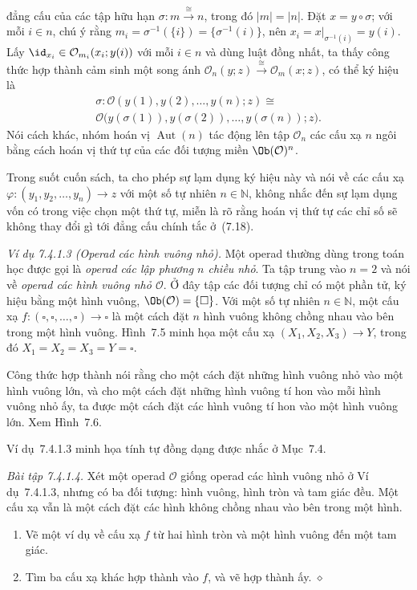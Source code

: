 đẳng cấu của các tập hữu hạn $\sigma:m\xrightarrow{\cong}n$, trong đó $|m|=|n|$. Đặt $x=y\circ\sigma$; với mỗi $i\in n$, chú ý rằng $m_i=\sigma^{-1}(\{i\})=\{\sigma^{-1}(i)\}$, nên $x_i=x|_{\sigma^{-1}(i)}=y(i)$. Lấy $\id_{x_i}\in\mathcal O_{m_i}(x_i;y(i))$ với mỗi $i\in n$ và dùng luật đồng nhất, ta thấy công thức hợp thành cảm sinh một song ánh $\mathcal O_n(y;z)\xrightarrow{\cong}\mathcal O_m(x;z)$, có thể ký hiệu là
\begin{equation}
\begin{aligned}
\sigma:\mathcal O(y(1),y(2),\ldots,y(n);z)\cong\qquad\\
\mathcal O\bigl(y(\sigma(1)),y(\sigma(2)),\ldots,y(\sigma(n));z\bigr).
\end{aligned}
\tag{7.18}
\end{equation}
Nói cách khác, nhóm hoán vị $\operatorname{Aut}(n)$ tác động lên tập $\mathcal O_n$ các cấu xạ $n$ ngôi bằng cách hoán vị thứ tự của các đối tượng miền $\Ob(\mathcal O)^n$.

Trong suốt cuốn sách, ta cho phép sự lạm dụng ký hiệu này và nói về các cấu xạ $\varphi:(y_1,y_2,\ldots,y_n)\to z$ với một số tự nhiên $n\in\mathbb N$, không nhắc đến sự lạm dụng vốn có trong việc chọn một thứ tự, miễn là rõ rằng hoán vị thứ tự các chỉ số sẽ không thay đổi gì tới đẳng cấu chính tắc ở~(7.18).

\noindent\textit{Ví dụ 7.4.1.3 (Operad các hình vuông nhỏ).}\keepwithnext
Một operad thường dùng trong toán học được gọi là \emph{operad các lập phương $n$ chiều nhỏ}. Ta tập trung vào $n=2$ và nói về \emph{operad các hình vuông nhỏ $\mathcal O$}. Ở đây tập các đối tượng chỉ có một phần tử, ký hiệu bằng một hình vuông, $\Ob(\mathcal O)=\{\square\}$. Với một số tự nhiên $n\in\mathbb N$, một cấu xạ $f:(\square,\square,\ldots,\square)\to\square$ là một cách đặt $n$ hình vuông không chồng nhau vào bên trong một hình vuông. Hình~7.5 minh họa một cấu xạ $(X_1,X_2,X_3)\to Y$, trong đó $X_1=X_2=X_3=Y=\square$.

Công thức hợp thành nói rằng cho một cách đặt những hình vuông nhỏ vào một hình vuông lớn, và cho một cách đặt những hình vuông tí hon vào mỗi hình vuông nhỏ ấy, ta được một cách đặt các hình vuông tí hon vào một hình vuông lớn. Xem Hình~7.6.

Ví dụ~7.4.1.3 minh họa tính tự đồng dạng được nhắc ở Mục~7.4.

\noindent\textit{Bài tập 7.4.1.4.}\keepwithnext
Xét một operad $\mathcal O$ giống operad các hình vuông nhỏ ở Ví dụ~7.4.1.3, nhưng có ba đối tượng: hình vuông, hình tròn và tam giác đều. Một cấu xạ vẫn là một cách đặt các hình không chồng nhau vào bên trong một hình.
\begin{enumerate}[label=\alph*.]
\item Vẽ một ví dụ về cấu xạ $f$ từ hai hình tròn và một hình vuông đến một tam giác.
\item Tìm ba cấu xạ khác hợp thành vào $f$, và vẽ hợp thành ấy.
\nobreak\hfill$\diamond$
\end{enumerate}

